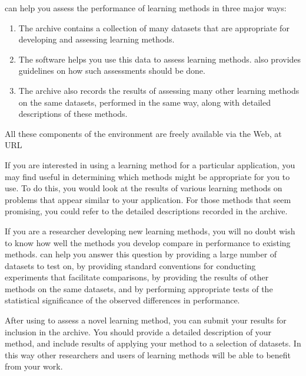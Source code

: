 \delve{} can help you assess the performance of learning methods
in three major ways:\vspace{-4pt}
\begin{enumerate}
\item The \delve{} archive contains a collection of many datasets that 
      are appropriate for developing and assessing learning methods.
\item The \delve{} software helps you use this data to assess
      learning methods. \delve{} also provides guidelines on how such 
      assessments should be done.
\item The \delve{} archive also records the results of assessing many
      other learning methods on the same datasets, performed in the same way, 
      along with detailed descriptions of these methods.\vspace{-4pt}
\end{enumerate}
All these components of the \delve{} environment are freely available
via the Web, at URL
\begin{center}
  \texttt{\wwwhome}
\end{center}

If you are interested in using a learning method for a particular
application, you may find \delve{} useful in determining which methods
might be appropriate for you to use.  To do this, you would
look at the results of various learning methods on problems that
appear similar to your application.  For those methods that seem 
promising, you could refer to the detailed descriptions recorded in
the \delve{} archive.

If you are a researcher developing new learning methods, you will no
doubt wish to know how well the methods you develop compare in
performance to existing methods. \delve{} can help you answer this
question by providing a large number of datasets to test on, by
providing standard conventions for conducting experiments that
facilitate comparisons, by providing the results of other methods on
the same datasets, and by performing appropriate tests of the
statistical significance of the observed differences in performance.

After using \delve{} to assess a novel learning method, you can submit
your results for inclusion in the \delve{} archive. You should provide a
detailed description of your method, and include results of applying
your method to a selection of datasets. In this way other researchers
and users of learning methods will be able to benefit from your work.

